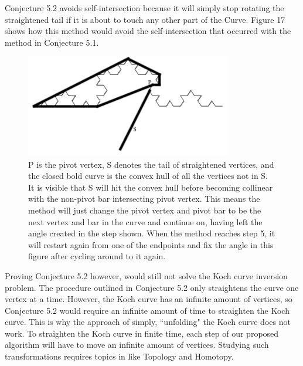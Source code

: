 \documentclass{article}
\theoremstyle{definition}
\begin{document}
\noindent Conjecture 5.2 avoids self-intersection because it will simply stop rotating the straightened tail if it is about to touch any other part of the Curve. Figure 17 shows how this method would avoid the self-intersection that occurred with the method in Conjecture 5.1.\vspace{0.5em}\\
\begin{figure}[h]
    \centering
    \includegraphics[width=0.8\textwidth]{NewMethodImage.png}
    \caption{P is the pivot vertex, S denotes the tail of straightened vertices, and the closed bold curve is the convex hull of all the vertices not in S. It is visible that S will hit the convex hull before becoming collinear with the non-pivot bar intersecting pivot vertex. This means the method will just change the pivot vertex and pivot bar to be the next vertex and bar in the curve and continue on, having left the angle created in the step shown. When the method reaches step 5, it will restart again from one of the endpoints and fix the angle in this figure after cycling around to it again.}
\end{figure}
\noindent Proving Conjecture 5.2 however, would still not solve the Koch curve inversion problem. The procedure outlined in Conjecture 5.2 only straightens the curve one vertex at a time. However, the Koch curve has an infinite amount of vertices, so Conjecture 5.2 would require an infinite amount of time to straighten the Koch curve. This is why the approach of simply, ``unfolding" the Koch curve does not work. To straighten the Koch curve in finite time, each step of our proposed algorithm will have to move an infinite amount of vertices. Studying such transformations requires topics in like Topology and Homotopy.
\end{document}
